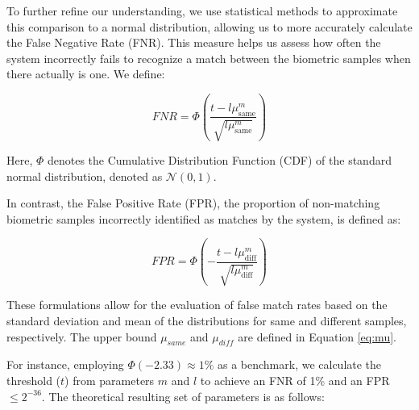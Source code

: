 To further refine our understanding, we use statistical methods to approximate this comparison to a normal distribution, allowing us to more accurately calculate the False Negative Rate (FNR). This measure helps us assess how often the system incorrectly fails to recognize a match between the biometric samples when there actually is one. We define:

\begin{equation}
    \label{eq:fnr}
    FNR = \Phi\left( \frac{t - l\mu_{\text{same}}^m}{\sqrt{l\mu_{\text{same}}^m}} \right)
\end{equation}

Here, \(\Phi\) denotes the Cumulative Distribution Function (CDF) of the standard normal distribution, denoted as \(\mathcal{N}(0, 1)\).

In contrast, the False Positive Rate (FPR), the proportion of non-matching biometric samples incorrectly identified as matches by the system, is defined as:

\begin{equation}
    \label{eq:fpr}
    FPR = \Phi\left(- \frac{t - l\mu_{\text{diff}}^m}{\sqrt{l\mu_{\text{diff}}^m}} \right)
\end{equation}

These formulations allow for the evaluation of false match rates based on the standard deviation and mean of the distributions for same and different samples, respectively. The upper bound \(\mu_{same}\) and \(\mu_{diff}\) are defined in Equation \ref{eq:mu}.

For instance, employing \(\Phi(-2.33) \approx 1\%\) as a benchmark, we calculate the threshold (\(t\)) from parameters \(m\) and \(l\) to achieve an FNR of 1\% and an FPR \(\leq 2^{-36} \). The theoretical resulting set of parameters is as follows: 

